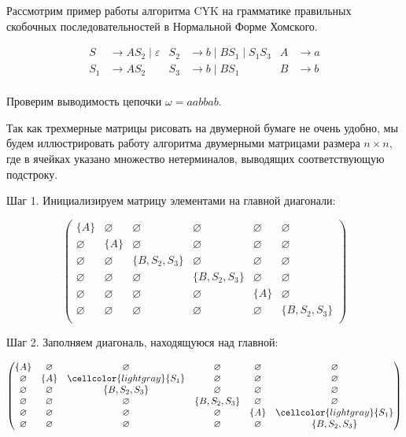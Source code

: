 \begin{example}\label{exampl:CYK}
  Рассмотрим пример работы алгоритма CYK на грамматике правильных скобочных последовательностей в Нормальной Форме Хомского.


\begin{align*}
S &\to A S_2 \mid \varepsilon & S_2  &\to b \mid B S_1 \mid S_1 S_3   & A   &\to a \\
S_1   &\to A S_2              & S_3  &\to b \mid B S_1              & B   &\to b\\
\end{align*}

Проверим выводимость цепочки $\omega = a a b b a b$.

Так как трехмерные матрицы рисовать на двумерной бумаге не очень удобно, мы будем иллюстрировать работу алгоритма двумерными матрицами размера $n \times n$, где в ячейках указано множество нетерминалов, выводящих соответствующую подстроку.

Шаг 1. Инициализируем матрицу элементами на главной диагонали:

\[
\begin{pmatrix}
\{A\}       & \varnothing & \varnothing    & \varnothing      & \varnothing & \varnothing    \\
\varnothing & \{A\}       & \varnothing    & \varnothing      & \varnothing & \varnothing    \\
\varnothing & \varnothing & \{B, S_2, S_3\} & \varnothing     & \varnothing & \varnothing    \\
\varnothing & \varnothing & \varnothing    & \{B, S_2, S_3\}   & \varnothing & \varnothing   \\
\varnothing & \varnothing & \varnothing    & \varnothing      & \{A\}       & \varnothing    \\
\varnothing & \varnothing & \varnothing    & \varnothing      & \varnothing & \{B, S_2, S_3\} \\
\end{pmatrix}
\]

Шаг 2. Заполняем диагональ, находящуюся над главной:

\[
\begin{pmatrix}
\{A\}       & \varnothing & \varnothing                             & \varnothing      & \varnothing & \varnothing    \\
\varnothing & \{A\}       & \cellcolor{lightgray}\{S_1\}            & \varnothing      & \varnothing & \varnothing    \\
\varnothing & \varnothing & \{B, S_2, S_3\} & \varnothing     & \varnothing & \varnothing    \\
\varnothing & \varnothing & \varnothing    & \{B, S_2, S_3\}   & \varnothing & \varnothing   \\
\varnothing & \varnothing & \varnothing    & \varnothing      & \{A\}       & \cellcolor{lightgray}\{S_1\}            \\
\varnothing & \varnothing & \varnothing    & \varnothing      & \varnothing & \{B, S_2, S_3\} \\
\end{pmatrix}
\]


\end{example}
